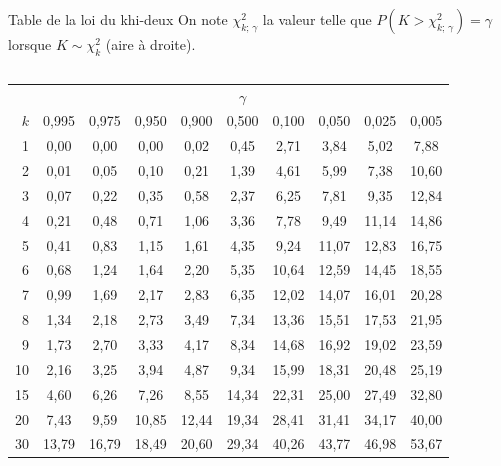 \documentclass{BeamerTemplate}
\begin{document}
\begin{frame}[t]{Table de la loi du khi-deux}
  On note $\chi^2_{k;\,\gamma}$ la valeur telle que $P(K > \chi^2_{k;\,\gamma}) = \gamma$ lorsque $K \sim \chi^2_k$ (\alert{aire à droite}).

  \smallskip
  \begin{columns}[T]
      \centering
      \footnotesize
      \setlength{\tabcolsep}{3pt}
      \renewcommand{\arraystretch}{0.92}
      \begin{tabular}{r|ccccccccc}
        \multicolumn{1}{c}{} & \multicolumn{9}{c}{$\gamma$} \\
        $k$ & 0,995 & 0,975 & 0,950 & 0,900 & 0,500 & 0,100 & 0,050 & 0,025 & 0,005 \\ \hline
1 & 0{,}00 & 0{,}00 & 0{,}00 & 0{,}02 & 0{,}45 & 2{,}71 & 3{,}84 & 5{,}02 & 7{,}88 \\
2 & 0{,}01 & 0{,}05 & 0{,}10 & 0{,}21 & 1{,}39 & 4{,}61 & 5{,}99 & 7{,}38 & 10{,}60 \\
3 & 0{,}07 & 0{,}22 & 0{,}35 & 0{,}58 & 2{,}37 & 6{,}25 & 7{,}81 & 9{,}35 & 12{,}84 \\
4 & 0{,}21 & 0{,}48 & 0{,}71 & 1{,}06 & 3{,}36 & 7{,}78 & 9{,}49 & 11{,}14 & 14{,}86 \\
5 & 0{,}41 & 0{,}83 & 1{,}15 & 1{,}61 & 4{,}35 & 9{,}24 & 11{,}07 & 12{,}83 & 16{,}75 \\
\rowcolor{Dominante!30} 6 & 0{,}68 & 1{,}24 & 1{,}64 & 2{,}20 & 5{,}35 & 10{,}64 & 12{,}59 & 14{,}45 & 18{,}55 \\
7 & 0{,}99 & 1{,}69 & 2{,}17 & 2{,}83 & 6{,}35 & 12{,}02 & 14{,}07 & 16{,}01 & 20{,}28 \\
8 & 1{,}34 & 2{,}18 & 2{,}73 & 3{,}49 & 7{,}34 & 13{,}36 & 15{,}51 & 17{,}53 & 21{,}95 \\
9 & 1{,}73 & 2{,}70 & 3{,}33 & 4{,}17 & 8{,}34 & 14{,}68 & 16{,}92 & 19{,}02 & 23{,}59 \\
10 & 2{,}16 & 3{,}25 & 3{,}94 & 4{,}87 & 9{,}34 & 15{,}99 & 18{,}31 & 20{,}48 & 25{,}19 \\
15 & 4{,}60 & 6{,}26 & 7{,}26 & 8{,}55 & 14{,}34 & 22{,}31 & 25{,}00 & 27{,}49 & 32{,}80 \\
20 & 7{,}43 & 9{,}59 & 10{,}85 & 12{,}44 & 19{,}34 & 28{,}41 & 31{,}41 & 34{,}17 & 40{,}00 \\
30 & 13{,}79 & 16{,}79 & 18{,}49 & 20{,}60 & 29{,}34 & 40{,}26 & 43{,}77 & 46{,}98 & 53{,}67 \\
      \end{tabular}
      \centering

\end{columns}
\end{frame}
\end{document}
